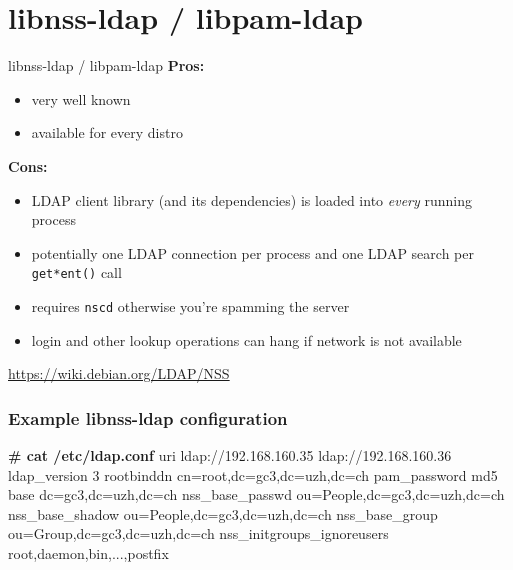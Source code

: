 \documentclass[english,serif,mathserif,usenames,dvipsnames]{beamer}
\begin{document}
\section{libnss-ldap / libpam-ldap}
\begin{frame}{libnss-ldap / libpam-ldap}
  \textbf{Pros:}
  \begin{itemize}
  \item very well known
  \item available for every distro
  \end{itemize}

  \+
  \textbf{Cons:}
  \begin{itemize}
  \item LDAP client library (and its dependencies) is loaded into \emph{every} running process
  \item potentially one LDAP connection per process and one LDAP search per \texttt{get*ent()} call
  \item requires \texttt{nscd} otherwise you're spamming the server
  \item login and other lookup operations can hang if network is not available
  \end{itemize}

  \begin{seealso}
    \url{https://wiki.debian.org/LDAP/NSS}
  \end{seealso}
\end{frame}

\begin{frame}[fragile]
  \frametitle{Example libnss-ldap configuration}
\begin{semiverbatim}\scriptsize
\textbf{# cat /etc/ldap.conf}
uri ldap://192.168.160.35 ldap://192.168.160.36
ldap_version 3
rootbinddn cn=root,dc=gc3,dc=uzh,dc=ch
pam_password md5
base dc=gc3,dc=uzh,dc=ch
nss_base_passwd        ou=People,dc=gc3,dc=uzh,dc=ch
nss_base_shadow        ou=People,dc=gc3,dc=uzh,dc=ch
nss_base_group         ou=Group,dc=gc3,dc=uzh,dc=ch
nss_initgroups_ignoreusers root,daemon,bin,...,postfix
\end{semiverbatim}
\end{frame}
\end{document}
